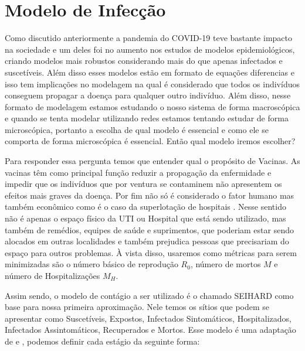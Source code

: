 \section{Modelo de Infecção}

Como discutido anteriormente a pandemia do COVID-19 teve bastante impacto na sociedade e um deles foi no aumento nos estudos de modelos epidemiológicos, criando modelos mais robustos \cite{Xiang2021} considerando mais do que apenas infectados e suscetíveis. Além disso esses modelos estão em formato de equações diferencias e isso tem implicações no modelagem na qual é considerado que todos os indivíduos conseguem propagar a doença para qualquer outro indivíduo. Além disso, nesse formato de modelagem estamos estudando o nosso sistema de forma macroscópica e quando se tenta modelar utilizando redes estamos tentando estudar de forma microscópica, portanto a escolha de qual modelo é essencial e como ele se comporta de forma microscópica é essencial. Então qual modelo iremos escolher?

Para responder essa pergunta temos que entender qual o propósito de Vacinas. As vacinas têm como principal função reduzir a propagação da enfermidade e impedir que os indivíduos que por ventura se contaminem não apresentem os efeitos mais graves da doença. Por fim não só é considerado o fator humano mas também econômico como é o caso da superlotação de hospitais \cite{French2021}. Nesse sentido não é apenas o espaço físico da UTI ou Hospital que está sendo utilizado, mas também de remédios, equipes de saúde e suprimentos, que poderiam estar sendo alocados em outras localidades e também prejudica pessoas que precisariam do espaço para outros problemas. À vista disso, usaremos como métricas para serem minimizadas são o número básico de reprodução $R_0$, número de mortos $M$ e número de Hospitalizações $M_H$.

Assim sendo, o modelo de contágio a ser utilizado é o chamado SEIHARD como base para nossa primeira aproximação. Nele temos os sítios que podem se apresentar como Suscetíveis, Expostos, Infectados Sintomáticos, Hospitalizados, Infectados Assintomáticos, Recuperados e Mortos. Esse modelo é uma adaptação de \cite{Eikenberry2020} e \cite{SEIHR}, podemos definir cada estágio da seguinte forma:

